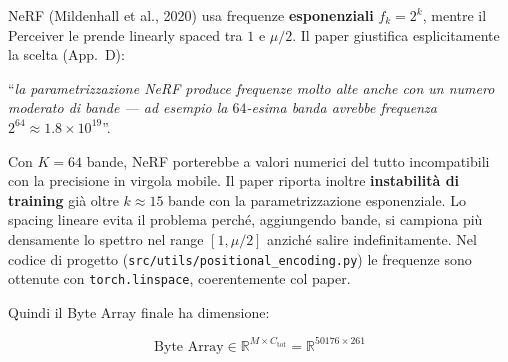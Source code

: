 \documentclass[
  11pt,
]{article}
\begin{document}
\begin{notabox}[title={\textbf{Perché non le frequenze di NeRF ($f_k = 2^k$)?}}]
NeRF (Mildenhall et al., 2020) usa frequenze \textbf{esponenziali} $f_k = 2^k$, mentre il Perceiver le prende linearly spaced tra $1$ e $\mu/2$. Il paper giustifica esplicitamente la scelta (App.\ D):

``\emph{la parametrizzazione NeRF produce frequenze molto alte anche con un numero moderato di bande --- ad esempio la $64$-esima banda avrebbe frequenza $2^{64} \approx 1.8 \times 10^{19}$}''.

Con $K = 64$ bande, NeRF porterebbe a valori numerici del tutto incompatibili con la precisione in virgola mobile. Il paper riporta inoltre \textbf{instabilità di training} già oltre $k \approx 15$ bande con la parametrizzazione esponenziale. Lo spacing lineare evita il problema perché, aggiungendo bande, si campiona più densamente lo spettro nel range $[1, \mu/2]$ anziché salire indefinitamente. Nel codice di progetto (\texttt{src/utils/positional\_encoding.py}) le frequenze sono ottenute con \texttt{torch.linspace}, coerentemente col paper.
\end{notabox}

Quindi il Byte Array finale ha dimensione:

\[
\text{Byte Array} \in \mathbb{R}^{M \times C_{\text{tot}}} = \mathbb{R}^{50176 \times 261}
\]
\end{document}

